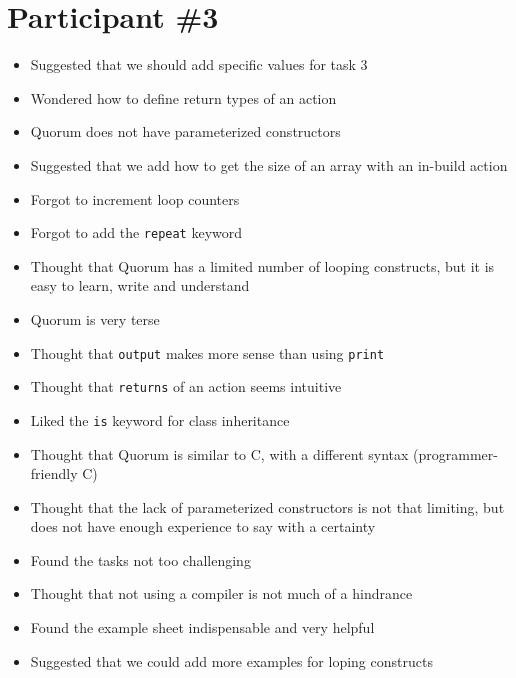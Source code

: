 \section{Participant {\#}3}
\begin{itemize}
\item Suggested that we should add specific values for task 3
\item Wondered how to define return types of an action
\item Quorum does not have parameterized constructors
\item Suggested that we add how to get the size of an array with an in-build action
\item Forgot to increment loop counters
\item Forgot to add the \lstinline!repeat! keyword
\item Thought that Quorum has a limited number of looping constructs, but it is easy to learn, write and understand
\item Quorum is very terse
\item Thought that \lstinline!output! makes more sense than using \lstinline!print!
\item Thought that \lstinline!returns! of an action seems intuitive
\item Liked the \lstinline!is! keyword for class inheritance
\item Thought that Quorum is similar to C, with a different syntax (programmer-friendly C) 
\item Thought that the lack of parameterized constructors is not that limiting, but does not have enough experience to say with a certainty
\item Found the tasks not too challenging 
\item Thought that not using a compiler is not much of a hindrance
\item Found the example sheet indispensable and very helpful
\item Suggested that we could add more examples for loping constructs
\end{itemize}

